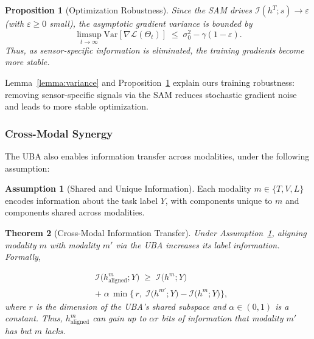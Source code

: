 \documentclass[letterpaper]{article} %
\theoremstyle{definition}                %
\newtheorem{assumption}{Assumption}[section]   %
\theoremstyle{plain}                     %
\newtheorem{theorem}{Theorem}[section]
\newtheorem{proposition}[theorem]{Proposition}
\theoremstyle{remark}                    %
\begin{document}
\begin{proposition}[Optimization Robustness]
\label{prop:robustness}
Since the SAM drives $\mathcal{I}(h^T; s)\to \varepsilon$ (with $\varepsilon\ge0$ small), the asymptotic gradient variance is bounded by 
\begin{equation}
\limsup_{t\to\infty}\mathrm{Var}[\nabla \mathcal{L}(\Theta_t)] 
\;\le\; \sigma_0^2 - \gamma(1-\varepsilon).
\end{equation}
Thus, as sensor-specific information is eliminated, the training gradients become more stable.
\end{proposition}

Lemma~\ref{lemma:variance} and Proposition~\ref{prop:robustness} explain ours training robustness: removing sensor-specific signals via the SAM reduces stochastic gradient noise and leads to more stable optimization.



\subsubsection{Cross-Modal Synergy}

The UBA also enables information transfer across modalities, under the following assumption:

\begin{assumption}[Shared and Unique Information]
\label{assum:information}
Each modality $m\in\{T,V,L\}$ encodes information about the task label $Y$, with components unique to $m$ and components shared across modalities.
\end{assumption}

\begin{theorem}[Cross-Modal Information Transfer]
\label{thm:cross_modal}
Under Assumption~\ref{assum:information}, aligning modality $m$ with modality $m'$ via the UBA increases its label information. Formally,

\begin{equation}
\begin{aligned}
&\mathcal{I}\!\bigl(h^m_{\mathrm{aligned}};Y\bigr)
\;\ge\;\mathcal{I}\!\bigl(h^m;Y\bigr)
\\
&+\;\alpha\,\min\!\bigl\{\,r,\;\mathcal{I}\!\bigl(h^{m'};Y\bigr)-\mathcal{I}\!\bigl(h^m;Y\bigr)\bigr\},
\end{aligned}
\end{equation}
where $r$ is the dimension of the UBA’s shared subspace and $\alpha\in(0,1)$ is a constant. Thus, $h^m_{\mathrm{aligned}}$ can gain up to $\alpha r$ bits of information that modality $m'$ has but $m$ lacks.
\end{theorem}
\end{document}

